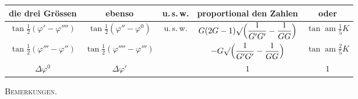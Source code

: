 \documentclass[12pt,a4paper]{article}
\newcommand{\tang}{\tan} %
\DeclareMathOperator{\am}{am} %
\begin{document}
\begin{center}
\begin{tabular}{c|c|c|c|c}
die drei Gr\"ossen & ebenso & u.\,s.\,w. & proportional den Zahlen & oder \\
\hline
$\tang\tfrac{1}{2}(\varphi' - \varphi'''')$ &
$\tang\tfrac{1}{2}(\varphi'' - \varphi^0)$ &
u.\,s.\,w. &
$G(2G-1)\surd\Bigl(\dfrac{1}{G'G'} - \dfrac{1}{GG}\Bigr)$ &
$\tang\am\tfrac{1}{5}K$ \\[1.5ex]
$\tang\tfrac{1}{2}(\varphi''' - \varphi'')$ &
$\tang\tfrac{1}{2}(\varphi'''' - \varphi''')$ & &
$-G\surd\Bigl(\dfrac{1}{G'G'} - \dfrac{1}{GG}\Bigr)$ &
$\tang\am\tfrac{2}{5}K$ \\[1.5ex]
$\Delta\varphi^0$ & $\Delta\varphi'$ & & $1$ & $1$
\end{tabular}
\end{center}

\newpage

\begin{center}
\textsc{Bemerkungen.}
\end{center}

\vspace{1em}
\end{document}
